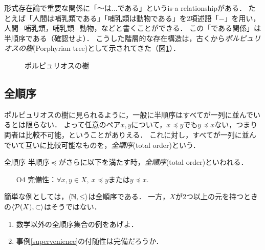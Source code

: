 \documentclass[dvipdfmx,11pt,a4paper]{jsarticle}
\begin{document}
\begin{example}
形式存在論で重要な関係に「〜は...である」というis-a relationshipがある．
たとえば「人間は哺乳類である」「哺乳類は動物である」を2項述語「$-$」を用い，人間$-$哺乳類，哺乳類$-$動物，などと書くことができる．
この「である関係」は半順序である（確認せよ）．
こうした階層的な存在構造は，古くから\emph{ポルピュリオスの樹}(Porphyrian tree)として示されてきた（図\ref{fig:porphyrian}）．
\end{example}
\begin{figure}[h]
\centering
{}
\caption{ポルピュリオスの樹}
\label{fig:porphyrian} 
\end{figure}


\subsection{全順序}
ポルピュリオスの樹に見られるように，一般に半順序はすべてが一列に並んでいるとは限らない．
よって任意のペア$x, y$について，$x \preceq y $でも$y \preceq x$ない，つまり両者は比較不可能，ということがありえる．
これに対し，すべてが一列に並んでいて互いに比較可能なものを，\emph{全順序}(total order)という．


\begin{itembox}[l]{全順序}
半順序$\preceq$がさらに以下を満たす時，\emph{全順序}(total order)といわれる．
\begin{itemize}
 \item[O4] 完備性：$\forall x, y \in X, \ x \preceq y$または$y \preceq x$. 
\end{itemize}
\end{itembox}
%
簡単な例としては，$\langle \mathbb{N}, \leq \rangle$は全順序である．
一方，$X$が2つ以上の元を持つときの$\langle \mathcal{P}(X), \subset \rangle$はそうではない．

\begin{exercise}
\begin{enumerate}
 \item 数学以外の全順序集合の例をあげよ．
 \item 事例\ref{supervenience}の付随性は完備だろうか．
\end{enumerate}
\end{exercise}
\end{document}
